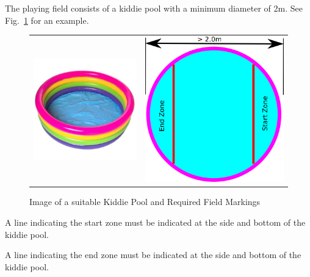 \documentclass[12pt]{hurocup}
\begin{document}
\begin{lawlist}[DBC]

\item The playing field consists of a kiddie pool with a minimum
  diameter of 2m. See Fig.~\ref{fig:kiddie-pool} for an example.

\begin{figure}
\begin{center}
\begin{tabular}{cc}
\includegraphics[width=0.4\linewidth]{Figures/kiddie-pool} &
\includegraphics[width=0.4\linewidth]{Figures/dbc-field} \\
\end{tabular}
\caption{Image of a suitable Kiddie Pool and Required Field Markings}
\label{fig:kiddie-pool}
\end{center}
\end{figure}

\item A line indicating the start zone must be indicated at the side
  and bottom of the kiddie pool.

\item A line indicating the end zone must be indicated at the side and
  bottom of the kiddie pool.

\end{lawlist}

\label{dbc-iteams-and-tools}
\end{document}
